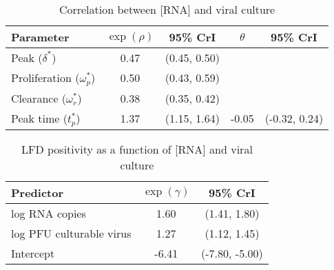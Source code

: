 \begin{appendix}
\begin{table}[p]
    \centering
    \caption{Correlation between [RNA] and viral culture}
    \begin{tabular}{lcccc}
     \toprule
     Parameter & $\exp(\rho)$ & 95\% CrI & $\theta$ & 95\% CrI\\
     \midrule
     Peak ($\delta^*$) & 0.47 & (0.45, 0.50) &  & \\
     Proliferation ($\omega_p^*$) & 0.50 & (0.43, 0.59) &  & \\
     Clearance ($\omega_r^*$) & 0.38 & (0.35, 0.42) &  & \\
     \midrule
     Peak time ($t_p^*$) & 1.37 & (1.15, 1.64) & -0.05 & (-0.32, 0.24)\\
     \bottomrule
     \end{tabular}
    \label{tab:corr}
\end{table}

\begin{table}[p]
    \centering
    \caption{LFD positivity as a function of [RNA] and viral culture}
    \begin{tabular}{lcc}
     \toprule
     Predictor & $\exp(\gamma)$ & 95\% CrI\\
     \midrule
     log RNA copies & 1.60 & (1.41, 1.80)\\
     log PFU culturable virus & 1.27 & (1.12, 1.45)\\
     \midrule
     Intercept & -6.41 & (-7.80, -5.00)\\
     \bottomrule
     \end{tabular}
    \label{tab:lfd}
\end{table}
\end{appendix}
